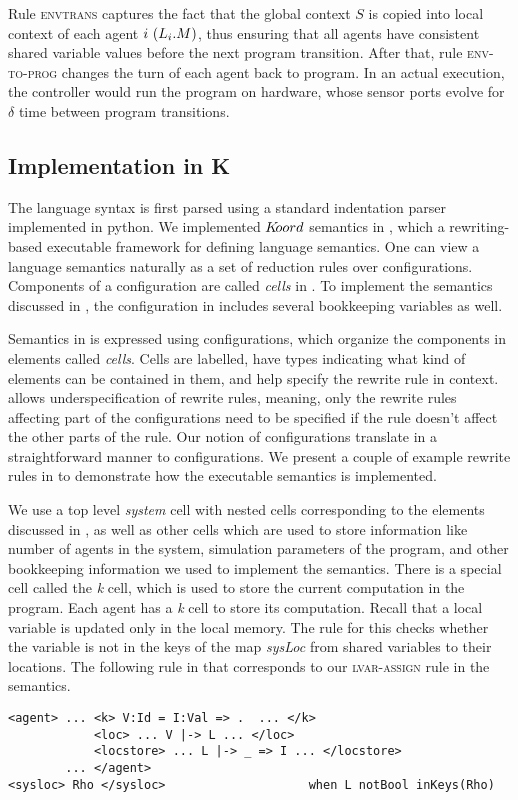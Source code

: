    
Rule \textsc{envtrans} captures the fact that the global context $S$ is copied into local context of each agent $i \ (L_{i}.M)$, thus ensuring that all agents have consistent shared variable values before the next program transition. After that, rule \textsc{env-to-prog} changes the turn of each agent back to program. In an actual execution, the controller  would run the program on hardware, whose sensor ports evolve for $\delta$ time between program transitions. 

\subsection{Implementation in K}

The language syntax is first parsed using a standard indentation parser implemented in python. We implemented $K\kern-2pt oord$ semantics in \K, which a rewriting-based executable framework for defining language semantics. One can view a language semantics naturally as a set of reduction rules over configurations. Components of a configuration are called {\em cells} in \K. To implement the semantics discussed in , the configuration in \K includes several bookkeeping variables as well. 


Semantics in \K is expressed using configurations, which organize the components in elements called {\em cells}. Cells are labelled, have types indicating what kind of elements can be contained in them, and help specify the rewrite rule in context. \K allows underspecification of rewrite rules, meaning, only the rewrite rules affecting part of the configurations need to be specified if the rule doesn't affect the other parts of the rule. Our notion of configurations translate in a straightforward manner to \K configurations. We present a couple of example rewrite rules in \K to demonstrate how the executable semantics is implemented.  


We use a top level {\em system} cell with nested cells corresponding to the elements discussed in , as well as other cells which are used to store information like number of agents in the system, simulation parameters of the program, and other bookkeeping information we used to implement the semantics. There is a special cell called the {\em k} cell, which is used to store the current computation in the program. Each agent has a {\em k} cell to store its computation. Recall that a local variable is updated only in the local memory. The rule for this checks whether the variable is not in the keys of the map {\em sysLoc} from shared variables to their locations. The following rule in \K that corresponds to our \textsc{lvar-assign} rule in the semantics. 
\vspace{2pt}
\begin{mdframed}
\begin{Verbatim}[fontsize=\tiny]
<agent> ... <k> V:Id = I:Val => .  ... </k> 
            <loc> ... V |-> L ... </loc> 
            <locstore> ... L |-> _ => I ... </locstore> 
        ... </agent> 
<sysloc> Rho </sysloc>                    when L notBool inKeys(Rho)        
\end{Verbatim}
\end{mdframed}


